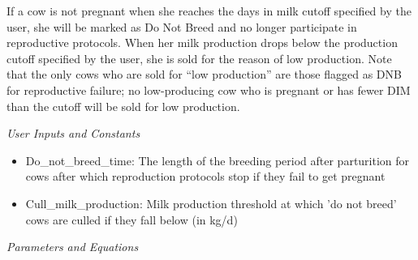 \documentclass{article}
\begin{document}
\begin{refsection}
\begin{enumerate}
        If a cow is not pregnant when she reaches the days in milk cutoff specified by the user, she will be marked as Do Not Breed and no longer participate in reproductive protocols. When her milk production drops below the production cutoff specified by the user, she is sold for the reason of low production. Note that the only cows who are sold for “low production” are those flagged as DNB for reproductive failure; no low-producing cow who is pregnant or has fewer DIM than the cutoff will be sold for low production. 

         \textit{User Inputs and Constants}
         \vspace{0.1cm}
         
         \begin{itemize}
             \item Do\_not\_breed\_time: The length of the breeding period after parturition for cows after which reproduction protocols stop if they fail to get pregnant
             \item Cull\_milk\_production: Milk production threshold at which 'do not breed' cows are culled if they fall below (in kg/d)
         \end{itemize}

         \textit{Parameters and Equations}
         \vspace{0.1cm}
        

\end{enumerate}
\end{refsection}
\end{document}
